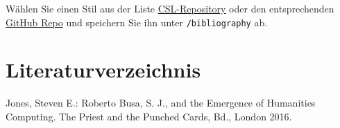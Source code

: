 \documentclass[12pt,de-CH,twoside,openright]{report}
\begin{document}
Wählen Sie einen Stil aus der Liste
\href{https://www.zotero.org/styles}{CSL-Repository} oder den
entsprechenden
\href{https://github.com/citation-style-language/styles}{GitHub Repo}
und speichern Sie ihn unter \texttt{/bibliography} ab.

\hypertarget{literaturverzeichnis}{%
\chapter*{Literaturverzeichnis}\label{literaturverzeichnis}}

\hypertarget{refs}{}
\leavevmode\hypertarget{ref-jones2016}{}%
Jones, Steven E.: Roberto Busa, S. J., and the Emergence of Humanities
Computing. The Priest and the Punched Cards, Bd., London 2016.


\newpage

\end{document}
